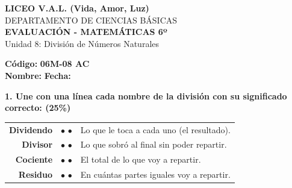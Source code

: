 \documentclass[12pt, letterpaper]{article}
\begin{document}
	
	\begin{center}
		{\Large \textbf{LICEO V.A.L. (Vida, Amor, Luz)}}\\[0.1cm]
		{\large DEPARTAMENTO DE CIENCIAS BÁSICAS}\\[0.1cm]
		\textbf{EVALUACIÓN - MATEMÁTICAS 6º}\\[0.1cm]
		Unidad 8: División de Números Naturales
	\end{center}
	
	
	\hfill \textbf{Código:} \textbf{06M-08 AC}\\
	
	\noindent \textbf{Nombre:} \underline{\hspace{8cm}} \hspace{1cm}\textbf{Fecha:} \underline{\hspace{3cm}}
	
	\vspace{0.6cm}
	
	\noindent \textbf{1. Une con una línea cada nombre de la división con su significado correcto: \hfill(25\%)}
	
	\vspace{0.4cm}
	\begin{center}
		\renewcommand{\arraystretch}{2}
		\begin{tabular}{r c l}
			\textbf{\Large Dividendo} & \hspace{1cm} $\bullet$ \hspace{2cm} $\bullet$ \hspace{1cm} & \large Lo que le toca a cada uno (el resultado). \\[0.2cm]
			\textbf{\Large Divisor}   & \hspace{1cm} $\bullet$ \hspace{2cm} $\bullet$ \hspace{1cm} & \large Lo que sobró al final sin poder repartir. \\[0.2cm]
			\textbf{\Large Cociente}    & \hspace{1cm} $\bullet$ \hspace{2cm} $\bullet$ \hspace{1cm} & \large El total de lo que voy a repartir. \\[0.2cm]
			\textbf{\Large Residuo}    & \hspace{1cm} $\bullet$ \hspace{2cm} $\bullet$ \hspace{1cm} & \large En cuántas partes iguales voy a repartir.
		\end{tabular}
	\end{center}
	
\end{document}
